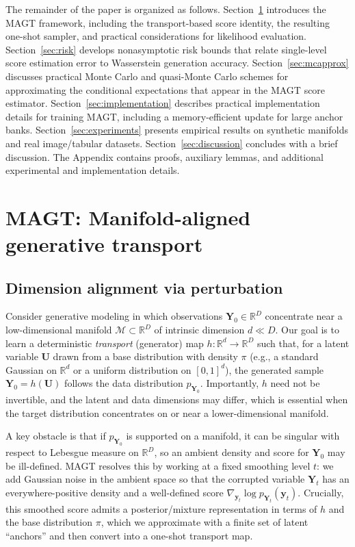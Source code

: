 \documentclass[12pt]{article}
\theoremstyle{definition} %
\newcommand{\U}{\bm U}
\newcommand{\Y}{\bm Y}
\newcommand{\y}{\bm y}
\providecommand{\method}{MAGT} %
\begin{document}
The remainder of the paper is organized as follows. Section~\ref{sec:magnet} introduces the \method{} framework, including the transport-based score identity, the resulting one-shot sampler, and practical considerations for likelihood evaluation. Section~\ref{sec:risk} develops nonasymptotic risk bounds that relate single-level score estimation error to Wasserstein generation accuracy. Section~\ref{sec:mcapprox} discusses practical Monte Carlo and quasi-Monte Carlo schemes for approximating the conditional expectations that appear in the \method{} score estimator. Section~\ref{sec:implementation} describes practical implementation details for training \method{}, including a memory-efficient update for large anchor banks. Section~\ref{sec:experiments} presents empirical results on synthetic manifolds and real image/tabular datasets. Section~\ref{sec:discussion} concludes with a brief discussion. The Appendix contains proofs, auxiliary lemmas, and additional experimental and implementation details.


\section{MAGT: Manifold-aligned generative transport}
\label{sec:magnet}

\subsection{Dimension alignment via perturbation}
\label{subsec:dim}

Consider generative modeling in which observations $\Y_0 \in \mathbb{R}^D$ concentrate near a low-dimensional
manifold $\mathcal{M} \subset \mathbb{R}^D$ of intrinsic dimension $d \ll D$.
Our goal is to learn a deterministic \emph{transport} (generator) map
\( h : \mathbb{R}^{d} \to \mathbb{R}^{D} \) such that, for a latent variable
\( \U \) drawn from a base distribution with density \( \pi \)
(e.g., a standard Gaussian on \( \mathbb{R}^{d} \) or a uniform distribution on $[0,1]^{d}$),
the generated sample \( \Y_0 = h(\U) \) follows the data distribution
\( p_{\Y_0} \). Importantly, $h$ need not be invertible, and the latent and data dimensions may differ, which is essential when
the target distribution concentrates on or near a lower-dimensional manifold.

A key obstacle is that if $p_{\Y_0}$ is supported on a manifold, it can be singular with respect to Lebesgue measure on $\mathbb{R}^D$,
so an ambient density and score for $\Y_0$ may be ill-defined.
\method{} resolves this by working at a fixed smoothing level $t$: we add Gaussian noise in the ambient space so that the corrupted
variable $\Y_t$ has an everywhere-positive density and a well-defined score $\nabla_{\y_t}\log p_{\Y_t}(\y_t)$.
Crucially, this smoothed score admits a posterior/mixture representation in terms of $h$ and the base distribution $\pi$, which we approximate with a finite
set of latent ``anchors'' and then convert into a one-shot transport map.
\end{document}

